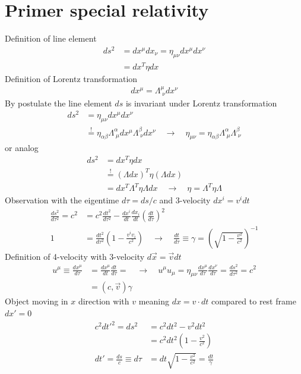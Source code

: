 \documentclass[10pt,a4paper]{article}
\theoremstyle{definition}
\begin{document}
\section{Primer special relativity}
Definition of line element
\begin{align}
    ds^2 &= dx^\mu dx_\nu = \eta_{\mu\nu}dx^\mu dx^\nu\\
        &= dx^T\eta dx
\end{align}
Definition of Lorentz transformation
\begin{align}
    dx^\mu = \Lambda^\mu_{\;\nu}dx^\nu
\end{align}
By postulate the line element $ds$ is invariant under Lorentz transformation
\begin{align}
    ds^2 &= \eta_{\mu\nu}dx^\mu dx^\nu\\
    &\stackrel{!}{=} \eta_{\alpha\beta}\Lambda^\alpha_{\;\mu}dx^\mu \Lambda^\beta_{\;\nu}dx^\nu\quad\rightarrow\quad \eta_{\mu\nu} = \eta_{\alpha\beta}\Lambda^\alpha_{\;\mu} \Lambda^\beta_{\;\nu}
\end{align}
or analog
\begin{align}
    ds^2 &= dx^T\eta dx\\
    &\stackrel{!}{=} (\Lambda dx)^T\eta (\Lambda dx)\\
    &= dx^T\Lambda^T\eta \Lambda dx\quad\rightarrow\quad \eta = \Lambda^T\eta\Lambda
\end{align}
Observation with the eigentime $d\tau=ds/c$ and 3-velocity $dx^i = v^i dt$
\begin{align}
    \frac{ds^2}{d\tau^2}=c^2&=c^2\frac{dt^2}{d\tau^2}-\frac{dx^i}{dt}\frac{dx_i}{dt}\left(\frac{dt}{d\tau}\right)^2\\
    1&=\frac{dt^2}{d\tau^2}\left(1-\frac{v^iv_i}{c^2}\right)\quad\rightarrow\quad\frac{dt}{d\tau}\equiv\gamma=\left(\sqrt{1-\frac{v^2}{c^2}}\right)^{-1}
\end{align}
Definition of 4-velocity with 3-velocity $d\vec{x} = \vec{v} dt$
\begin{align}
    u^\mu\equiv\frac{dx^\mu}{d\tau}&=\frac{dx^\mu}{dt}\frac{dt}{d\tau}=\quad\rightarrow\quad u^\mu u_\mu=\eta_{\mu\nu}\frac{dx^\mu}{d\tau} \frac{dx^\nu}{d\tau}=\frac{ds^2}{d\tau^2}=c^2\\
    &=(c,\vec{v})\gamma
\end{align}
Object moving in $x$ direction with $v$ meaning $dx=v\cdot dt$ compared to
rest frame $dx'=0$
\begin{align}
    c^2dt'^2=ds^2 &= c^2dt^2- v^2 dt^2\\
    &=c^2dt^2\left(1-\frac{v^2}{c^2}\right)\\
    dt'=\frac{ds}{c}\equiv d\tau&=dt\sqrt{1-\frac{v^2}{c^2}}=\frac{dt}{\gamma}
\end{align}
\end{document}
